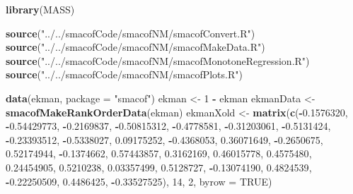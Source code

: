 \documentclass[
  12pt,
]{article}
\newenvironment{Shaded}{\begin{snugshade}}{\end{snugshade}}
\newcommand{\AttributeTok}[1]{\textcolor[rgb]{0.13,0.29,0.53}{#1}}
\newcommand{\ConstantTok}[1]{\textcolor[rgb]{0.56,0.35,0.01}{#1}}
\newcommand{\DecValTok}[1]{\textcolor[rgb]{0.00,0.00,0.81}{#1}}
\newcommand{\FloatTok}[1]{\textcolor[rgb]{0.00,0.00,0.81}{#1}}
\newcommand{\FunctionTok}[1]{\textcolor[rgb]{0.13,0.29,0.53}{\textbf{#1}}}
\newcommand{\NormalTok}[1]{#1}
\newcommand{\OtherTok}[1]{\textcolor[rgb]{0.56,0.35,0.01}{#1}}
\newcommand{\SpecialCharTok}[1]{\textcolor[rgb]{0.81,0.36,0.00}{\textbf{#1}}}
\newcommand{\StringTok}[1]{\textcolor[rgb]{0.31,0.60,0.02}{#1}}
\begin{document}
\begin{Shaded}
\begin{Highlighting}[]
\FunctionTok{library}\NormalTok{(MASS)}

\FunctionTok{source}\NormalTok{(}\StringTok{"../../smacofCode/smacofNM/smacofConvert.R"}\NormalTok{)}
\FunctionTok{source}\NormalTok{(}\StringTok{"../../smacofCode/smacofNM/smacofMakeData.R"}\NormalTok{)}
\FunctionTok{source}\NormalTok{(}\StringTok{"../../smacofCode/smacofNM/smacofMonotoneRegression.R"}\NormalTok{)}
\FunctionTok{source}\NormalTok{(}\StringTok{"../../smacofCode/smacofNM/smacofPlots.R"}\NormalTok{)}

\FunctionTok{data}\NormalTok{(ekman, }\AttributeTok{package =} \StringTok{"smacof"}\NormalTok{)}
\NormalTok{ekman }\OtherTok{\textless{}{-}} \DecValTok{1} \SpecialCharTok{{-}}\NormalTok{ ekman }
\NormalTok{ekmanData }\OtherTok{\textless{}{-}} \FunctionTok{smacofMakeRankOrderData}\NormalTok{(ekman)}
\NormalTok{ekmanXold }\OtherTok{\textless{}{-}} \FunctionTok{matrix}\NormalTok{(}\FunctionTok{c}\NormalTok{(}\SpecialCharTok{{-}}\FloatTok{0.1576320}\NormalTok{, }\SpecialCharTok{{-}}\FloatTok{0.54429773}\NormalTok{,}
                      \SpecialCharTok{{-}}\FloatTok{0.2169837}\NormalTok{, }\SpecialCharTok{{-}}\FloatTok{0.50815312}\NormalTok{,}
                      \SpecialCharTok{{-}}\FloatTok{0.4778581}\NormalTok{, }\SpecialCharTok{{-}}\FloatTok{0.31203061}\NormalTok{,}
                      \SpecialCharTok{{-}}\FloatTok{0.5131424}\NormalTok{, }\SpecialCharTok{{-}}\FloatTok{0.23393512}\NormalTok{,}
                      \SpecialCharTok{{-}}\FloatTok{0.5338027}\NormalTok{,  }\FloatTok{0.09175252}\NormalTok{,}
                      \SpecialCharTok{{-}}\FloatTok{0.4368053}\NormalTok{,  }\FloatTok{0.36071649}\NormalTok{,}
                      \SpecialCharTok{{-}}\FloatTok{0.2650675}\NormalTok{,  }\FloatTok{0.52174944}\NormalTok{,}
                      \SpecialCharTok{{-}}\FloatTok{0.1374662}\NormalTok{, }\FloatTok{0.57443857}\NormalTok{,}
                      \FloatTok{0.3162169}\NormalTok{,  }\FloatTok{0.46015778}\NormalTok{,}
                      \FloatTok{0.4575480}\NormalTok{,  }\FloatTok{0.24454905}\NormalTok{,}
                      \FloatTok{0.5210238}\NormalTok{,  }\FloatTok{0.03357499}\NormalTok{,}
                      \FloatTok{0.5128727}\NormalTok{, }\SpecialCharTok{{-}}\FloatTok{0.13074190}\NormalTok{,}
                      \FloatTok{0.4824539}\NormalTok{, }\SpecialCharTok{{-}}\FloatTok{0.22250509}\NormalTok{,}
                      \FloatTok{0.4486425}\NormalTok{, }\SpecialCharTok{{-}}\FloatTok{0.33527525}\NormalTok{), }\DecValTok{14}\NormalTok{, }\DecValTok{2}\NormalTok{, }\AttributeTok{byrow =} \ConstantTok{TRUE}\NormalTok{)}
\end{Highlighting}
\end{Shaded}
\end{document}
